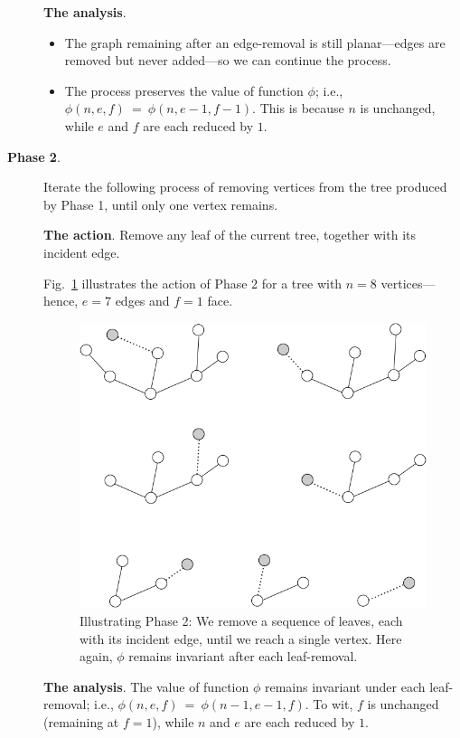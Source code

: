 \begin{description}
\bigskip

{\bf The analysis}.
\begin{itemize}
\item
The graph remaining after an edge-removal is still planar---edges are
removed but never added---so we can continue the process.
\item
The process preserves the value of function $\phi$; i.e., $\phi(n,e,f) \ = \ \phi(n,e-1,f-1)$.
This is because $n$ is unchanged, while $e$ and $f$ are each reduced by $1$.
\end{itemize}

\smallskip

\item[{\bf Phase 2}.]
Iterate the following process of removing vertices from the tree produced
by Phase 1, until only one vertex remains.
\bigskip

{\bf The action}.
Remove any leaf of the current tree, together with its incident edge.

Fig.~\ref{fig:planarStep2} illustrates the action of Phase  2
for a tree  with $n=8$ vertices---hence, $e=7$ edges and $f=1$ face.
\begin{figure}[hbt]
\begin{center}
   \includegraphics[scale=0.35]{FiguresGraph/planarStep2}
   \caption{Illustrating Phase 2: We remove a sequence of leaves, each
     with its incident edge, until we reach a single vertex.  Here again,
     $\phi$ remains invariant after each leaf-removal.}
  \label{fig:planarStep2}
\end{center}
\end{figure}

\bigskip

{\bf The analysis}.
The value of function $\phi$ remains invariant under each leaf-removal; i.e.,
$\phi(n,e,f) \ = \ \phi(n-1,e-1,f)$.
To wit, $f$ is unchanged (remaining at $f=1$), while $n$ and $e$ are
each reduced by $1$.
\end{description}

